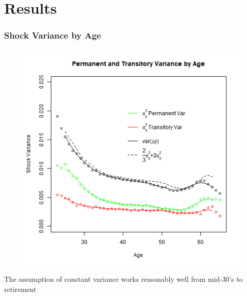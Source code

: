 \documentclass{beamer}
\begin{document}
\section{Results}
\frame
{
	\frametitle{Shock Variance by Age}
	\begin{figure}
		\includegraphics[scale=0.35]{../Figures/VarianceByAge_level_lincome_head.png}
	\end{figure}
	\vspace{-0.25in}
	The assumption of constant variance works reasonably well from mid-30's to retirement
}
\frame
\end{document}
